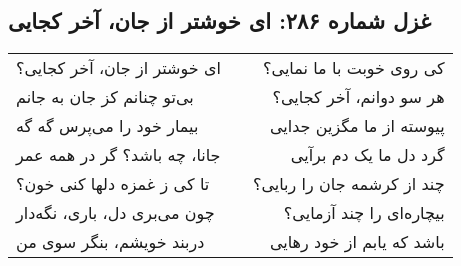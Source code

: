 \begin{center}
\section*{غزل شماره ۲۸۶: ای خوشتر از جان، آخر کجایی}
\label{sec:286}
\begin{longtable}{l p{0.5cm} r}
ای خوشتر از جان، آخر کجایی؟
&&
کی روی خوبت با ما نمایی؟
\\
بی‌تو چنانم کز جان به جانم
&&
هر سو دوانم، آخر کجایی؟
\\
بیمار خود را می‌پرس گه گه
&&
پیوسته از ما مگزین جدایی
\\
جانا، چه باشد؟ گر در همه عمر
&&
گرد دل ما یک دم برآیی
\\
تا کی ز غمزه دلها کنی خون؟
&&
چند از کرشمه جان را ربایی؟
\\
چون می‌بری دل، باری، نگه‌دار
&&
بیچاره‌ای را چند آزمایی؟
\\
دربند خویشم، بنگر سوی من
&&
باشد که یابم از خود رهایی
\\
\end{longtable}
\end{center}
